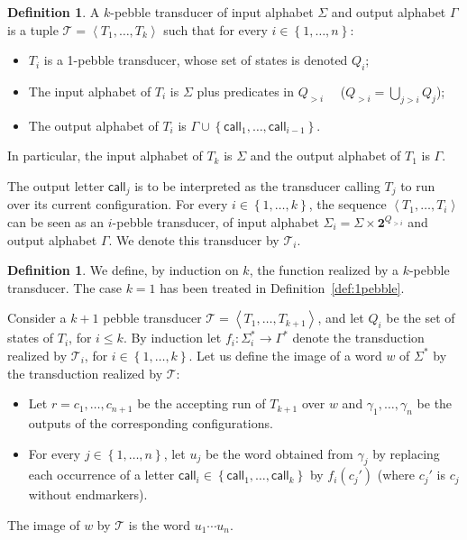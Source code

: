 \documentclass{article}
\newcommand{\set}[1]{\left\{#1 \right\}}
\newcommand{\atuple}[1]{\left\langle #1 \right\rangle}
\newcommand{\Tt}{\mathcal T}
\newcommand{\call}{\mathsf {call}}
\theoremstyle{definition}
\newtheorem{definition}[theorem]{Definition}
\theoremstyle{remark}
\begin{document}
\begin{definition}
  A $k$-pebble transducer of input alphabet $\Sigma$ and output alphabet $\Gamma$ is a tuple $\Tt=\atuple{T_1,\dots,T_{k}}$ such that for every $i\in\set{1,\ldots,n}$:
  \begin{itemize}
  \item  $T_i$ is a 1-pebble transducer, whose set of states is denoted $Q_i$;
  \item  The input alphabet of $T_i$ is $\Sigma$ plus predicates in $Q_{>i}\quad$ ($Q_{>i}=\bigcup_{j>i}Q_j$);
  \item  The output alphabet of $T_i$ is $\Gamma \cup \set{\call_1,\ldots,\call_{i-1}}$.
  \end{itemize} 
  In particular, the input alphabet of $T_k$ is $\Sigma$ and the output alphabet of $T_1$ is $\Gamma$.
\end{definition}
The output letter $\call_j$ is to be interpreted as the transducer calling $T_j$ to run over its current configuration.
For every $i\in\set{1,\ldots, k}$,  the sequence $\atuple{T_1,\ldots,T_i}$ can be seen as an $i$-pebble transducer, of input alphabet $\Sigma_i=\Sigma\times \mathbf 2 ^{Q_{>i}}$ and output alphabet $\Gamma$. We denote this transducer by $\Tt_i$.

 \begin{definition}
We define, by induction on $k$, the function realized by a $k$-pebble transducer. The case $k=1$ has been treated in Definition~\ref{def:1pebble}. 

Consider a $k+1$ pebble transducer $\Tt=\atuple{T_1,\ldots,T_{k+1}}$, and let $Q_i$ be the set of states of $T_i$, for $i\leq k$.
By induction let $f_i:\Sigma_i^*\to \Gamma^*$ denote the transduction realized by $\Tt_i$, for $i\in \set{1,\ldots,k}$.
Let us define the image of a word $w$ of $\Sigma^*$ by the transduction realized by $\Tt$:
\begin{itemize}
  \item Let $r=c_1,\ldots,c_{n+1}$ be the accepting run of $T_{k+1}$ over $w$ and $\gamma_1,\ldots,\gamma_n$ be the outputs of the corresponding configurations.
  
  \item  For every $j\in\set{1,\ldots,n}$, let $u_j$ be the word obtained from $\gamma_j$ by replacing each occurrence of a letter $\call_i\in \set{\call_1,\ldots,\call_k}$ by $f_i(c_j')$ (where $c_j'$ is $c_j$ without endmarkers).
  
  \end{itemize}
  The image of $w$ by $\Tt$ is the word $u_1\cdots u_n$.
\end{definition}
\end{document}
